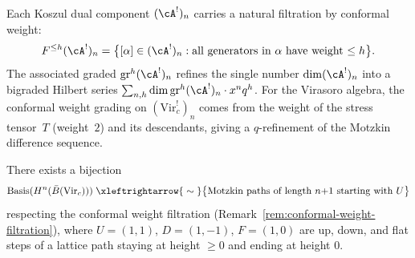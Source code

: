 \begin{remark}\label{rem:conformal-weight-filtration}
Each Koszul dual component $(\cA^!)_n$ carries a natural filtration by conformal weight:
\[
F^{\leq h} (\cA^!)_n = \bigl\{[\alpha] \in (\cA^!)_n :
\text{all generators in $\alpha$ have weight $\leq h$}\bigr\}.
\]
The associated graded $\operatorname{gr}^h (\cA^!)_n$ refines the single number
$\dim (\cA^!)_n$ into a bigraded Hilbert series
$\sum_{n,h} \dim \operatorname{gr}^h (\cA^!)_n \cdot x^n q^h$.
For the Virasoro algebra, the conformal weight grading on
$(\mathrm{Vir}_c^!)_n$ comes from the weight of the stress tensor~$T$
(weight~$2$) and its descendants, giving a $q$-refinement of the
Motzkin difference sequence.
\end{remark}

\begin{theorem}
\label{thm:motzkin-path-model}
There exists a bijection
\begin{equation}\label{eq:motzkin-bijection}
\operatorname{Basis}(H^n(\bar{B}(\mathrm{Vir}_c)))
\;\xleftrightarrow{\;\sim\;}
\bigl\{\text{Motzkin paths of length $n{+}1$ starting with $U$}\bigr\}
\end{equation}
respecting the conformal weight filtration
\textup{(}Remark~\textup{\ref{rem:conformal-weight-filtration})},
where $U = (1,1)$, $D = (1,-1)$, $F = (1,0)$
are up, down, and flat steps of a lattice path staying
at height $\geq 0$ and ending at height $0$.
\end{theorem}

